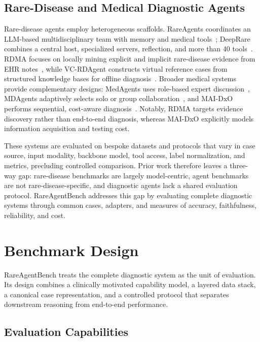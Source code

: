 \documentclass[letterpaper]{article} %
\begin{document}
\subsection{Rare-Disease and Medical Diagnostic Agents}

Rare-disease agents employ heterogeneous scaffolds. RareAgents coordinates an LLM-based multidisciplinary team with memory and medical tools~\cite{chen2026rareagents}; DeepRare combines a central host, specialized servers, reflection, and more than 40 tools~\cite{zhao2026deeprare}. RDMA focuses on locally mining explicit and implicit rare-disease evidence from EHR notes~\cite{wu2025rdma}, while VC-RDAgent constructs virtual reference cases from structured knowledge bases for offline diagnosis~\cite{liu2026vcrdagent}. Broader medical systems provide complementary designs: MedAgents uses role-based expert discussion~\cite{tang2024medagents}, MDAgents adaptively selects solo or group collaboration~\cite{kim2024mdagents}, and MAI-DxO performs sequential, cost-aware diagnosis~\cite{nori2025sequential}. Notably, RDMA targets evidence discovery rather than end-to-end diagnosis, whereas MAI-DxO explicitly models information acquisition and testing cost.

These systems are evaluated on bespoke datasets and protocols that vary in case source, input modality, backbone model, tool access, label normalization, and metrics, precluding controlled comparison. Prior work therefore leaves a three-way gap: rare-disease benchmarks are largely model-centric, agent benchmarks are not rare-disease-specific, and diagnostic agents lack a shared evaluation protocol. RareAgentBench addresses this gap by evaluating complete diagnostic systems through common cases, adapters, and measures of accuracy, faithfulness, reliability, and cost.


\section{Benchmark Design}
\label{sec-4}

RareAgentBench treats the complete diagnostic system as the unit of evaluation. Its design combines a clinically motivated capability model, a layered data stack, a canonical case representation, and a controlled protocol that separates downstream reasoning from end-to-end performance.

\subsection{Evaluation Capabilities}
\label{sec-4-1}
\end{document}
